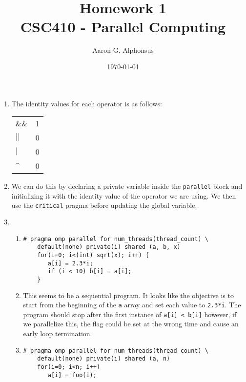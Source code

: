 \documentclass{article}
\title{Homework 1\\ CSC410 - Parallel Computing}
\author{Aaron G. Alphonsus}
\date{\today}
\begin{document}
\maketitle


\begin{enumerate}

\item The identity values for each operator is as follows: 
\begin{table}[ht]
    \setlength{\parindent}{10ex}
    \begin{tabular}{ll}
        \&\&                 & 1 \\
        $||$                 & 0 \\
        $|$                  & 0 \\
        \textasciicircum{}   & 0
    \end{tabular}
\end{table}

\item We can do this by declaring a private variable inside the 
\texttt{parallel} block and initializing it with the identity value of the 
operator we are using. We then use the \texttt{critical} pragma before updating 
the global variable.

\item 
\begin{enumerate}[label=(\alph*)]

    \item 
\begin{lstlisting}
# pragma omp parallel for num_threads(thread_count) \
    default(none) private(i) shared (a, b, x)
    for(i=0; i<(int) sqrt(x); i++) {
       a[i] = 2.3*i;
       if (i < 10) b[i] = a[i];
    }
\end{lstlisting}

    \item 
    This seems to be a sequential program. It looks like the objective is
    to start from the beginning of the \texttt{a} array and set each value to
    \texttt{2.3*i}. The program should stop after the first instance of
    \texttt{a[i] < b[i]} however, if we parallelize this, the flag could be set
    at the wrong time and cause an early loop termination.

    \item
\begin{lstlisting}
# pragma omp parallel for num_threads(thread_count) \
    default(none) private(i) shared (a, n) 
    for(i=0; i<n; i++)
       a[i] = foo(i);
\end{lstlisting}


\end{enumerate}
\end{enumerate}
\end{document}
